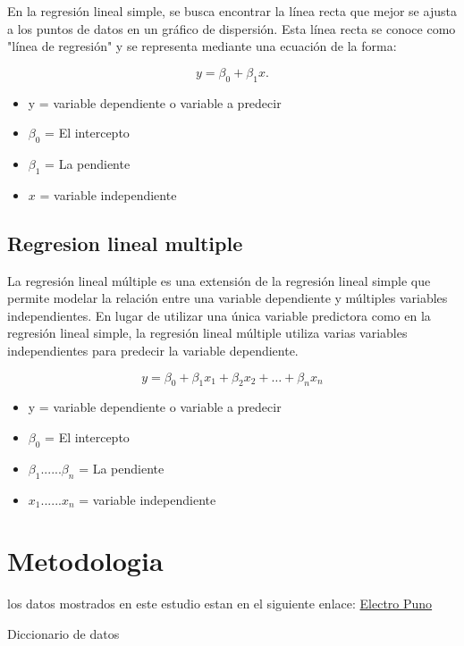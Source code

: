 \documentclass{article}
\begin{document}
En la regresión lineal simple, se busca encontrar la línea recta que mejor se ajusta a los puntos de datos en un gráfico de dispersión. Esta línea recta se conoce como "línea de regresión" y se representa mediante una ecuación de la forma:

\[
  y = \beta_0 + \beta_1x .   
\]

\begin{itemize}
  \item y = variable dependiente o variable a predecir
  \item \( \beta_0 \) = El intercepto 
  \item \( \beta_1 \) = La pendiente
  \item \( x \) = variable independiente
\end{itemize}


\subsection{Regresion lineal multiple}


La regresión lineal múltiple es una extensión de la regresión lineal simple que permite modelar la relación entre una variable dependiente y múltiples variables independientes. En lugar de utilizar una única variable predictora como en la regresión lineal simple, la regresión lineal múltiple utiliza varias variables independientes para predecir la variable dependiente.

\[ y = \beta_0 + \beta_1x_1 + \beta_2x_2 + \ldots + \beta_nx_n \]
\begin{itemize}
  \item y = variable dependiente o variable a predecir
  \item \( \beta_0 \) = El intercepto 
  \item \( \beta_1 ...... \beta_n \) = La pendiente
  \item \( x_1......x_n \) = variable independiente
\end{itemize}
\section{Metodologia}
los datos mostrados en este estudio estan en el siguiente enlace: \href{https://www.datosabiertos.gob.pe/dataset/consumo-de-energ%C3%ADa-el%C3%A9ctrica-de-los-clientes-de-electro-puno-saa}{Electro Puno}

Diccionario de datos
\end{document}
